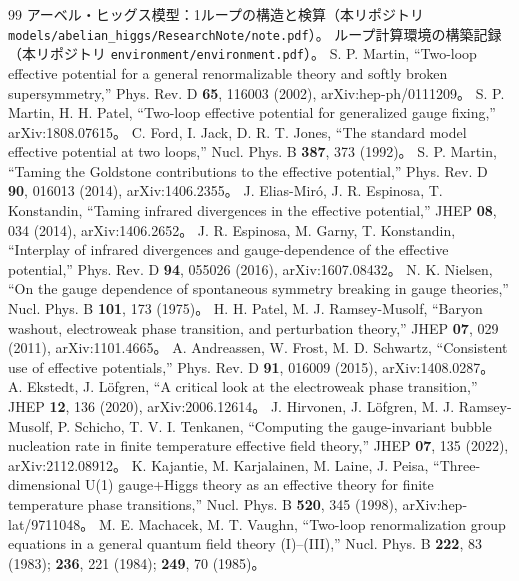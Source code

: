 \documentclass[a4paper,10pt]{ltjsarticle}
\begin{document}
\begin{thebibliography}{99}
 アーベル・ヒッグス模型：1ループの構造と検算（本リポジトリ \nolinkurl{models/abelian_higgs/ResearchNote/note.pdf}）。
 ループ計算環境の構築記録（本リポジトリ \nolinkurl{environment/environment.pdf}）。
 S. P. Martin, ``Two-loop effective potential for a general renormalizable theory and softly broken supersymmetry,'' Phys. Rev. D \textbf{65}, 116003 (2002), arXiv:hep-ph/0111209。
 S. P. Martin, H. H. Patel, ``Two-loop effective potential for generalized gauge fixing,'' arXiv:1808.07615。
 C. Ford, I. Jack, D. R. T. Jones, ``The standard model effective potential at two loops,'' Nucl. Phys. B \textbf{387}, 373 (1992)。
 S. P. Martin, ``Taming the Goldstone contributions to the effective potential,'' Phys. Rev. D \textbf{90}, 016013 (2014), arXiv:1406.2355。
 J. Elias-Miró, J. R. Espinosa, T. Konstandin, ``Taming infrared divergences in the effective potential,'' JHEP \textbf{08}, 034 (2014), arXiv:1406.2652。
 J. R. Espinosa, M. Garny, T. Konstandin, ``Interplay of infrared divergences and gauge-dependence of the effective potential,'' Phys. Rev. D \textbf{94}, 055026 (2016), arXiv:1607.08432。
 N. K. Nielsen, ``On the gauge dependence of spontaneous symmetry breaking in gauge theories,'' Nucl. Phys. B \textbf{101}, 173 (1975)。
 H. H. Patel, M. J. Ramsey-Musolf, ``Baryon washout, electroweak phase transition, and perturbation theory,'' JHEP \textbf{07}, 029 (2011), arXiv:1101.4665。
 A. Andreassen, W. Frost, M. D. Schwartz, ``Consistent use of effective potentials,'' Phys. Rev. D \textbf{91}, 016009 (2015), arXiv:1408.0287。
 A. Ekstedt, J. Löfgren, ``A critical look at the electroweak phase transition,'' JHEP \textbf{12}, 136 (2020), arXiv:2006.12614。
 J. Hirvonen, J. Löfgren, M. J. Ramsey-Musolf, P. Schicho, T. V. I. Tenkanen, ``Computing the gauge-invariant bubble nucleation rate in finite temperature effective field theory,'' JHEP \textbf{07}, 135 (2022), arXiv:2112.08912。
 K. Kajantie, M. Karjalainen, M. Laine, J. Peisa, ``Three-dimensional U(1) gauge+Higgs theory as an effective theory for finite temperature phase transitions,'' Nucl. Phys. B \textbf{520}, 345 (1998), arXiv:hep-lat/9711048。
 M. E. Machacek, M. T. Vaughn, ``Two-loop renormalization group equations in a general quantum field theory (I)--(III),'' Nucl. Phys. B \textbf{222}, 83 (1983); \textbf{236}, 221 (1984); \textbf{249}, 70 (1985)。

\end{thebibliography}
\end{document}
